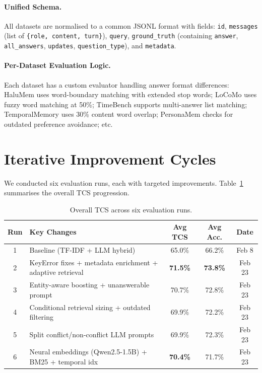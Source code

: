 \documentclass[11pt,a4paper]{article}
\begin{document}
\paragraph{Unified Schema.}
All datasets are normalised to a common JSONL format with fields:
\texttt{id}, \texttt{messages} (list of \texttt{\{role, content, turn\}}),
\texttt{query}, \texttt{ground\_truth} (containing \texttt{answer},
\texttt{all\_answers}, \texttt{updates}, \texttt{question\_type}), and
\texttt{metadata}.

\paragraph{Per-Dataset Evaluation Logic.}
Each dataset has a custom evaluator handling answer format differences:
HaluMem uses word-boundary matching with extended stop words; LoCoMo uses
fuzzy word matching at 50\%; TimeBench supports multi-answer list matching;
TemporalMemory uses 30\% content word overlap; PersonaMem checks for
outdated preference avoidance; etc.


\section{Iterative Improvement Cycles}
\label{sec:results}

We conducted six evaluation runs, each with targeted improvements.
Table~\ref{tab:runs-summary} summarises the overall TCS progression.

\begin{table}[H]
\centering
\caption{Overall TCS across six evaluation runs.}
\label{tab:runs-summary}
\small
\begin{tabular}{clccc}
\toprule
\textbf{Run} & \textbf{Key Changes} & \textbf{Avg TCS} & \textbf{Avg Acc.} & \textbf{Date} \\
\midrule
1 & Baseline (TF-IDF + LLM hybrid) & 65.0\% & 66.2\% & Feb 8 \\
2 & KeyError fixes + metadata enrichment + adaptive retrieval & \textbf{71.5\%} & \textbf{73.8\%} & Feb 23 \\
3 & Entity-aware boosting + unanswerable prompt & 70.7\% & 72.8\% & Feb 23 \\
4 & Conditional retrieval sizing + outdated filtering & 69.9\% & 72.2\% & Feb 23 \\
5 & Split conflict/non-conflict LLM prompts & 69.9\% & 72.3\% & Feb 23 \\
6 & Neural embeddings (Qwen2.5-1.5B) + BM25 + temporal idx & \textbf{70.4\%} & 71.7\% & Feb 23 \\
\bottomrule
\end{tabular}
\end{table}
\end{document}
